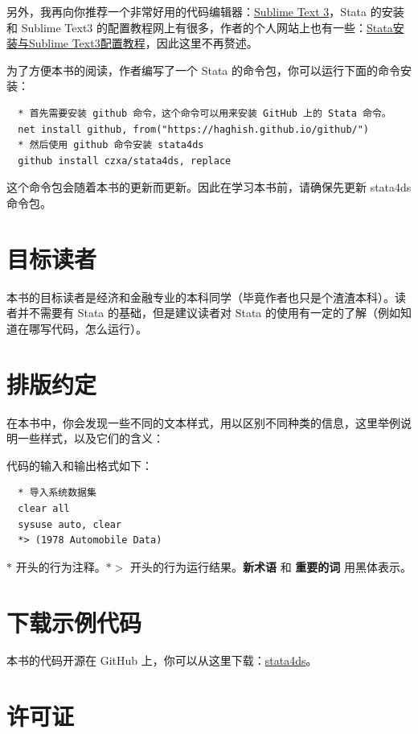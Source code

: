 另外，我再向你推荐一个非常好用的代码编辑器：\href{http://www.sublimetext.com/}{Sublime Text 3}，Stata 的安装和 Sublime Text3 的配置教程网上有很多，作者的个人网站上也有一些：\href{https://www.czxa.top/posts/59313/}{Stata安装与Sublime Text3配置教程}，因此这里不再赘述。

为了方便本书的阅读，作者编写了一个 Stata 的命令包，你可以运行下面的命令安装：

\begin{lstlisting}
  * 首先需要安装 github 命令，这个命令可以用来安装 GitHub 上的 Stata 命令。
  net install github, from("https://haghish.github.io/github/")
  * 然后使用 github 命令安装 stata4ds
  github install czxa/stata4ds, replace
\end{lstlisting}

这个命令包会随着本书的更新而更新。因此在学习本书前，请确保先更新 stata4ds 命令包。

\section{目标读者}

本书的目标读者是经济和金融专业的本科同学（毕竟作者也只是个渣渣本科）。读者并不需要有 Stata 的基础，但是建议读者对 Stata 的使用有一定的了解（例如知道在哪写代码，怎么运行）。

\section{排版约定}

在本书中，你会发现一些不同的文本样式，用以区别不同种类的信息，这里举例说明一些样式，以及它们的含义：

代码的输入和输出格式如下：

\begin{lstlisting}
  * 导入系统数据集
  clear all
  sysuse auto, clear
  *> (1978 Automobile Data)
\end{lstlisting}

\textcolor{second1}{$*$} 开头的行为注释。\textcolor{second1}{$*>$} 开头的行为运行结果。\textbf{新术语} 和 \textbf{重要的词} 用黑体表示。

\section{下载示例代码}

本书的代码开源在 GitHub 上，你可以从这里下载：\href{https://github.com/czxa/stata4ds}{stata4ds}。

\section{许可证}

